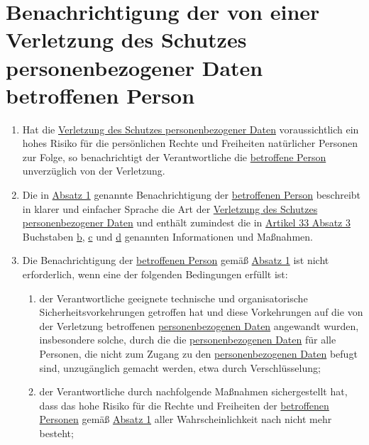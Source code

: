 \chapter{Benachrichtigung der von einer Verletzung des Schutzes personenbezogener Daten betroffenen Person}
\label{ch:34}


\begin{enumerate}

  \item Hat die \hyperref[itm:04-12]{Verletzung des Schutzes personenbezogener Daten} voraussichtlich ein hohes Risiko für die persönlichen
   Rechte und Freiheiten natürlicher Personen zur Folge, so benachrichtigt der Verantwortliche die \hyperref[itm:04-1]{betroffene Person}
   unverzüglich von der Verletzung.
  \label{itm:34-1}

  \item Die in \hyperref[itm:34-1]{Absatz 1} genannte Benachrichtigung der \hyperref[itm:04-1]{betroffenen Person} beschreibt in klarer und
   einfacher Sprache die Art der \hyperref[itm:04-12]{Verletzung des Schutzes personenbezogener Daten} und enthält zumindest die in
   \hyperref[itm:33-3]{Artikel 33 Absatz 3} Buchstaben \hyperref[itm:33-3b]{b}, \hyperref[itm:33-3c]{c} und \hyperref
    [itm:33-3d]{d} genannten Informationen und Maßnahmen.
  \label{itm:34-2}

  \item Die Benachrichtigung der \hyperref[itm:04-1]{betroffenen Person} gemäß \hyperref[itm:34-1]{Absatz 1} ist nicht erforderlich, wenn eine der folgenden
   Bedingungen erfüllt ist:
  \label{itm:34-3}

  \begin{enumerate}
  
    \item der Verantwortliche geeignete technische und organisatorische Sicherheitsvorkehrungen getroffen hat und diese
     Vorkehrungen auf die von der Verletzung betroffenen \hyperref[itm:04-1]{personenbezogenen Daten} angewandt wurden, insbesondere solche,
     durch die die \hyperref[itm:04-1]{personenbezogenen Daten} für alle Personen, die nicht zum Zugang zu den \hyperref[itm:04-1]{personenbezogenen Daten}
     befugt sind, unzugänglich gemacht werden, etwa durch Verschlüsselung;
    \label{itm:34-3a}

    \item der Verantwortliche durch nachfolgende Maßnahmen sichergestellt hat, dass das hohe Risiko für die Rechte und
     Freiheiten der \hyperref[itm:04-1]{betroffenen Personen} gemäß \hyperref[itm:34-1]{Absatz 1} aller Wahrscheinlichkeit nach nicht mehr
     besteht;
    \label{itm:34-3b}


\end{enumerate}
\end{enumerate}

